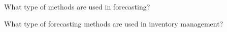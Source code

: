 \begin{exercise}
What type of methods are used in forecasting?

\end{exercise}

\begin{exercise}
What type of forecasting methods are used in inventory management?

\end{exercise}

